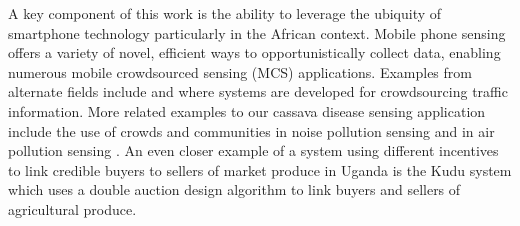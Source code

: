 \documentclass[letterpaper]{article} %
\begin{document}
A key component of this work is the ability to leverage the ubiquity of smartphone technology particularly in the African context. Mobile phone sensing offers a variety of novel, efficient ways to opportunistically collect data, enabling numerous mobile crowdsourced sensing (MCS) applications. Examples from alternate fields include \cite{mohan2008nericell} and \cite{thiagarajan2009vtrack} where systems are developed for crowdsourcing traffic information. More related examples to our cassava disease sensing application include the use of crowds and communities in noise pollution sensing \cite{rana2010ear} and in air pollution sensing \cite{stevens2010crowdsourcing}. An even closer example of a system using different incentives to link credible buyers to sellers of market produce in Uganda is the Kudu system \cite{ssekibuule2013mobile} which uses a double auction design algorithm to link buyers and sellers of agricultural produce.
\\




\end{document}
